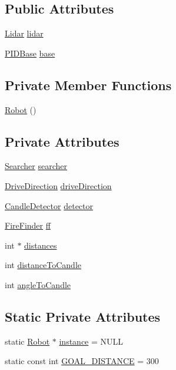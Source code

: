 \subsection*{Public Attributes}
\begin{DoxyCompactItemize}
\item 
\hyperlink{classLidar}{Lidar} \hyperlink{classRobot_a222e54f477e23f5af80cfa10bcd85e7a}{lidar}
\item 
\hyperlink{classPIDBase}{P\-I\-D\-Base} \hyperlink{classRobot_adbf538f97c0f9f98337f5171e715badc}{base}
\end{DoxyCompactItemize}
\subsection*{Private Member Functions}
\begin{DoxyCompactItemize}
\item 
\hyperlink{classRobot_a4fc7c70ae20623f05e06f2ecb388b6c4}{Robot} ()
\end{DoxyCompactItemize}
\subsection*{Private Attributes}
\begin{DoxyCompactItemize}
\item 
\hyperlink{classSearcher}{Searcher} \hyperlink{classRobot_af0ba30c47b84dc976f5bb7bd978f95ef}{searcher}
\item 
\hyperlink{DriveMotor_8hpp_a077d9d13989efa3142086ea83cbb1e68}{Drive\-Direction} \hyperlink{classRobot_af15d2eaa46a9736e5d3d3aa9e8a9751c}{drive\-Direction}
\item 
\hyperlink{classCandleDetector}{Candle\-Detector} \hyperlink{classRobot_a19cb4c2ee87b595db9275e6b3d9ca30d}{detector}
\item 
\hyperlink{classFireFinder}{Fire\-Finder} \hyperlink{classRobot_a342f5f8be2b5641eb3ae8f9c8475ebe6}{ff}
\item 
int $\ast$ \hyperlink{classRobot_aba9dccea96aa95bb8fbdd1a5ba72ca73}{distances}
\item 
int \hyperlink{classRobot_afae387e4e9419530d3217055301ba939}{distance\-To\-Candle}
\item 
int \hyperlink{classRobot_a7c1bd342087a6eedeeb0df07fa9cf3d2}{angle\-To\-Candle}
\end{DoxyCompactItemize}
\subsection*{Static Private Attributes}
\begin{DoxyCompactItemize}
\item 
static \hyperlink{classRobot}{Robot} $\ast$ \hyperlink{classRobot_aad5c5d6db601aac62393d47ec9385fa3}{instance} = N\-U\-L\-L
\item 
static const int \hyperlink{classRobot_afb4449356b3a3f92b2c76c612e8951ee}{G\-O\-A\-L\-\_\-\-D\-I\-S\-T\-A\-N\-C\-E} = 300
\end{DoxyCompactItemize}


